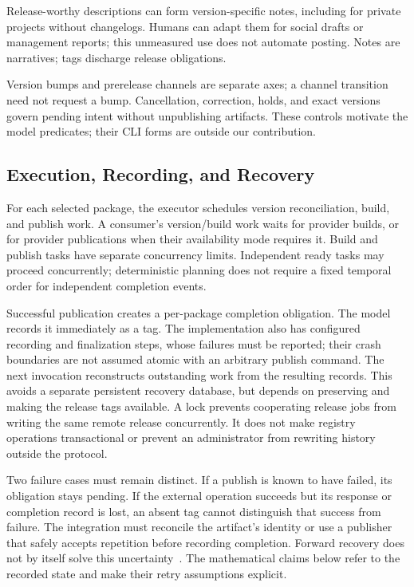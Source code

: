 Release-worthy descriptions can form version-specific notes, including for
private projects without changelogs. Humans can adapt them for social drafts
or management reports; this unmeasured use does not automate posting.
Notes are narratives; tags discharge release obligations.

Version bumps and prerelease channels are separate axes; a channel transition
need not request a bump. Cancellation, correction, holds, and exact versions
govern pending intent without unpublishing artifacts. These controls motivate
the model predicates; their CLI forms are outside our contribution.

\subsection{Execution, Recording, and Recovery}
For each selected package, the executor schedules version reconciliation,
build, and publish work. A consumer's version/build work waits for provider
builds, or for provider publications when their availability mode requires it.
Build and publish tasks have separate concurrency limits. Independent ready
tasks may proceed concurrently; deterministic planning does not require a
fixed temporal order for independent completion events.

Successful publication creates a per-package completion obligation. The model
records it immediately as a tag. The implementation also has configured
recording and finalization steps, whose failures must be reported; their
crash boundaries are not assumed atomic with an arbitrary publish command.
The next invocation reconstructs outstanding work from the resulting records.
This avoids a separate persistent recovery database, but depends on preserving
and making the release tags available. A lock prevents cooperating release
jobs from writing the same remote release concurrently. It does not make
registry operations transactional or prevent an administrator from rewriting
history outside the protocol.

Two failure cases must remain distinct. If a publish is known to have failed,
its obligation stays pending. If the external operation succeeds but its
response or completion record is lost, an absent tag cannot distinguish that
success from failure. The integration must reconcile the artifact's identity
or use a publisher that safely accepts repetition before recording completion.
Forward recovery does not by itself solve this uncertainty~\cite{helland12}.
The mathematical claims below refer to the recorded state and make their
retry assumptions explicit.

